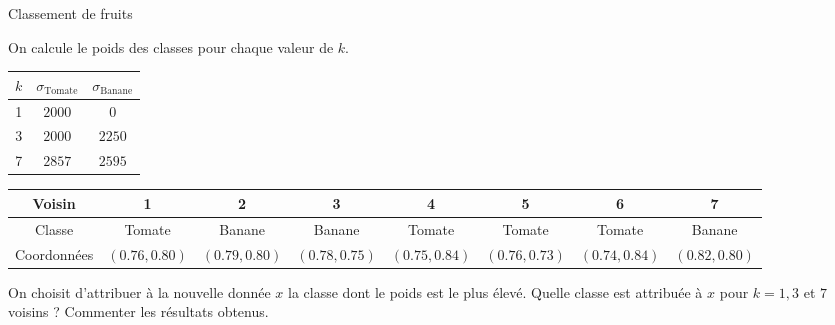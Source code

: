 \begin{exo}[PC][2][devoir]{Classement de fruits}
\begin{quest}
{    On calcule le poids des classes pour chaque valeur de $k$.
    \begin{center}
      \begin{tabular}{|c|c|c|}
        \hline
        $k$ & $\sigma_{\text{Tomate}}$ & $\sigma_{\text{Banane}}$ \\
        \hline
        1 & $2000$ & $0$ \\
        \hline
        3 & $2000$ & $2250$ \\
        \hline
        7 & $2857$ & $2595$ \\
        \hline
      \end{tabular}
    \end{center}
  }
  \begin{center}\small
  \begin{tabular}{|c|c|c|c|c|c|c|c|}
    \hline
    Voisin & 1 & 2 & 3 & 4 & 5 & 6 & 7\\
    \hline
    Classe & Tomate & Banane & Banane & Tomate & Tomate & Tomate & Banane \\
    \hline
    Coordonnées & $(0.76,0.80)$ &  $(0.79,0.80)$ & $(0.78,0.75)$ & $(0.75,0.84)$ & $(0.76,0.73)$ & $(0.74,0.84)$ & $(0.82,0.80)$\\
    \hline
  \end{tabular}
  \end{center}
  \item On choisit d'attribuer à la nouvelle donnée $x$ la classe dont le  poids est le plus élevé. Quelle classe est attribuée à $x$ pour $k=1,3$ et $7$ voisins ? Commenter les résultats obtenus.
 \end{quest}
  
  
\end{exo}
